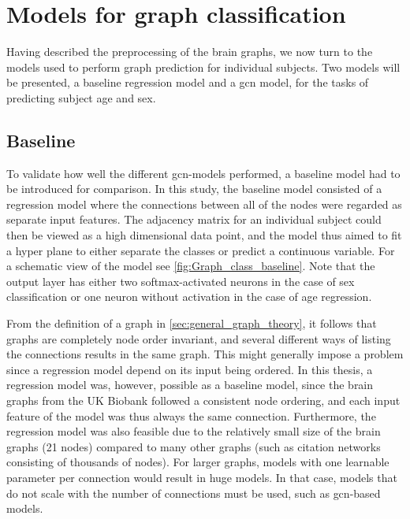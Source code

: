 \section{Models for graph classification}

Having described the preprocessing of the brain graphs, we now turn to the models used to perform graph prediction for individual subjects. Two models will be presented, a baseline regression model and a \acrshort{gcn} model, for the tasks of predicting subject age and sex.

\subsection{Baseline}
To validate how well the different \acrshort{gcn}-models performed, a baseline model had to be introduced for comparison. In this study, the baseline model consisted of a regression model where the connections between all of the nodes were regarded as separate input features. The adjacency matrix for an individual subject could then be viewed as a high dimensional data point, and the model thus aimed to fit a hyper plane to either separate the classes or predict a continuous variable. For a schematic view of the model see \cref{fig:Graph_class_baseline}. Note that the output layer has either two softmax-activated neurons in the case of sex classification or one neuron without activation in the case of age regression. 

From the definition of a graph in \cref{sec:general_graph_theory}, it follows that graphs are completely node order invariant, and several different ways of listing the connections results in the same graph. This might generally impose a problem since a regression model depend on its input being ordered. In this thesis, a regression model was, however, possible as a baseline model, since the brain graphs from the UK Biobank followed a consistent node ordering, and each input feature of the model was thus always the same connection. Furthermore, the regression model was also feasible due to the relatively small size of the brain graphs (21 nodes) compared to many other graphs (such as citation networks consisting of thousands of nodes). For larger graphs, models with one learnable parameter per connection would result in huge models. In that case, models that do not scale with the number of connections must be used, such as \acrshort{gcn}-based models. 

%         

